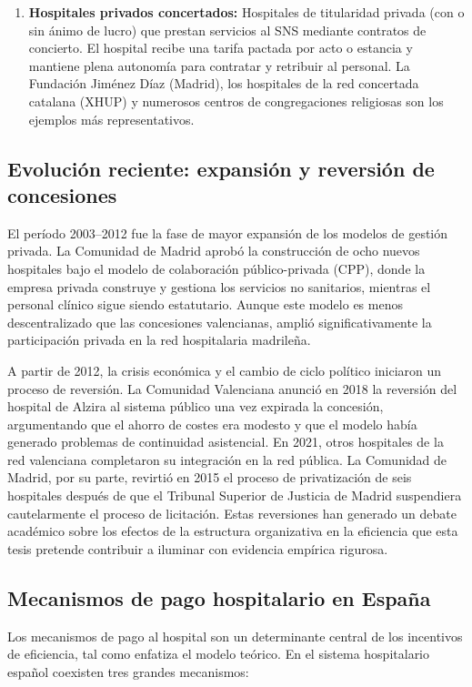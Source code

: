 \documentclass[12pt, a4paper, twoside, openright]{book}
\theoremstyle{plain}
\theoremstyle{definition}
\theoremstyle{remark}
\begin{document}
\begin{enumerate}[label=(\roman*)]
  \item \textbf{Hospitales privados concertados:} Hospitales de titularidad privada (con o sin ánimo de lucro) que prestan servicios al SNS mediante contratos de concierto. El hospital recibe una tarifa pactada por acto o estancia y mantiene plena autonomía para contratar y retribuir al personal. La Fundación Jiménez Díaz (Madrid), los hospitales de la red concertada catalana (XHUP) y numerosos centros de congregaciones religiosas son los ejemplos más representativos.
\end{enumerate}

\subsection{Evolución reciente: expansión y reversión de concesiones}

El período 2003--2012 fue la fase de mayor expansión de los modelos de gestión privada. La Comunidad de Madrid aprobó la construcción de ocho nuevos hospitales bajo el modelo de colaboración público-privada (CPP), donde la empresa privada construye y gestiona los servicios no sanitarios, mientras el personal clínico sigue siendo estatutario. Aunque este modelo es menos descentralizado que las concesiones valencianas, amplió significativamente la participación privada en la red hospitalaria madrileña.

A partir de 2012, la crisis económica y el cambio de ciclo político iniciaron un proceso de reversión. La Comunidad Valenciana anunció en 2018 la reversión del hospital de Alzira al sistema público una vez expirada la concesión, argumentando que el ahorro de costes era modesto y que el modelo había generado problemas de continuidad asistencial. En 2021, otros hospitales de la red valenciana completaron su integración en la red pública. La Comunidad de Madrid, por su parte, revirtió en 2015 el proceso de privatización de seis hospitales después de que el Tribunal Superior de Justicia de Madrid suspendiera cautelarmente el proceso de licitación. Estas reversiones han generado un debate académico sobre los efectos de la estructura organizativa en la eficiencia que esta tesis pretende contribuir a iluminar con evidencia empírica rigurosa.

\subsection{Mecanismos de pago hospitalario en España}

Los mecanismos de pago al hospital son un determinante central de los incentivos de eficiencia, tal como enfatiza el modelo teórico. En el sistema hospitalario español coexisten tres grandes mecanismos:
\end{document}
